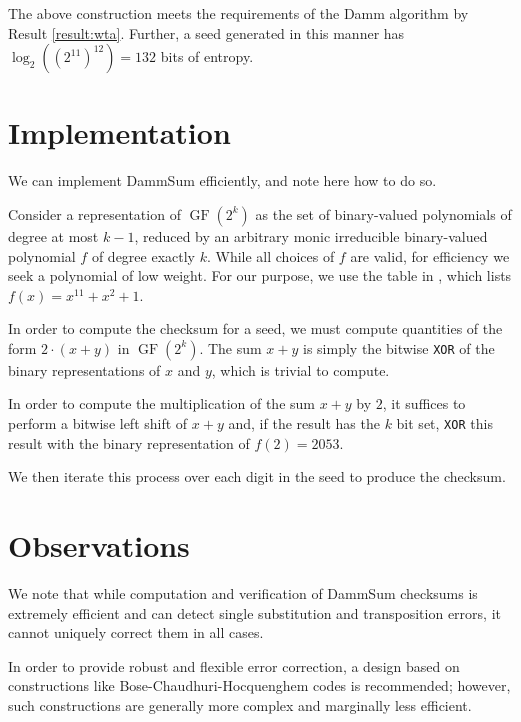 \documentclass{article}
\theoremstyle{plain}
\theoremstyle{definition}
\newcommand{\GF}{\operatorname{GF}}
\begin{document}
The above construction meets the requirements of the Damm algorithm by Result \ref{result:wta}.
Further, a seed generated in this manner has $\log_2\left((2^{11})^{12}\right) = 132$ bits of entropy.


\section{Implementation}

We can implement DammSum efficiently, and note here how to do so.

Consider a representation of $\GF(2^k)$ as the set of binary-valued polynomials of degree at most $k-1$, reduced by an arbitrary monic irreducible binary-valued polynomial $f$ of degree exactly $k$.
While all choices of $f$ are valid, for efficiency we seek a polynomial of low weight.
For our purpose, we use the table in \cite{hp}, which lists $f(x) = x^{11} + x^2 + 1$.

In order to compute the checksum for a seed, we must compute quantities of the form $2 \cdot (x + y)$ in $\GF(2^k)$.
The sum $x + y$ is simply the bitwise \texttt{XOR} of the binary representations of $x$ and $y$, which is trivial to compute.

In order to compute the multiplication of the sum $x + y$ by $2$, it suffices to perform a bitwise left shift of $x + y$ and, if the result has the $k$ bit set, \texttt{XOR} this result with the binary representation of $f(2) = 2053$.

We then iterate this process over each digit in the seed to produce the checksum.


\section{Observations}

We note that while computation and verification of DammSum checksums is extremely efficient and can detect single substitution and transposition errors, it cannot uniquely correct them in all cases.

In order to provide robust and flexible error correction, a design based on constructions like Bose-Chaudhuri-Hocquenghem codes \cite{hocquenghem,bose} is recommended; however, such constructions are generally more complex and marginally less efficient.




\end{document}

